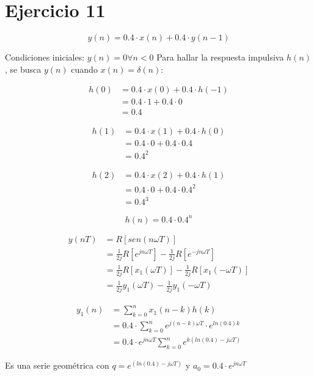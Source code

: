 \documentclass[../../guia1.tex]{subfiles}
\begin{document}
\section*{Ejercicio 11}
\[y(n) = 0.4\cdot x(n) + 0.4\cdot y(n-1)\]

Condiciones iniciales: $y(n)=0 \forall n<0$
Para hallar la respuesta impulsiva $h(n)$, se busca $y(n)$ cuando $x(n) = \delta(n)$:

\begin{align*}
	h(0) &= 0.4\cdot x(0) + 0.4 \cdot h(-1)\\
		 &= 0.4\cdot 1 + 0.4 \cdot 0\\
		 &= 0.4
\end{align*}


\begin{align*}
	h(1) &= 0.4\cdot x(1) + 0.4 \cdot h(0)\\
		 &= 0.4\cdot 0 + 0.4 \cdot 0.4\\
		 &=0.4^2
\end{align*}


\begin{align*}
	h(2) &= 0.4\cdot x(2) + 0.4 \cdot h(1)\\
		 &= 0.4\cdot 0 + 0.4 \cdot 0.4^2\\
		 &= 0.4^3
\end{align*}


\[h(n) = 0.4\cdot 0.4^n\]

\begin{align*}
y(nT) &= R \left[sen(n\omega T)\right]\\
	 &= \frac{1}{2j} R\left[ e^{jn\omega T}\right]
	  - \frac{1}{2j} R\left[e^{-jn\omega T}\right]\\
	 &= \frac{1}{2j} R\left[ x_1(\omega T)\right]
	  - \frac{1}{2j} R\left[ x_1(-\omega T)\right]\\
	 &= \frac{1}{2j} y_1(\omega T)
	  - \frac{1}{2j} y_1(-\omega T)
\end{align*}

\vspace{.5in}

\begin{align*}
y_1(n) &=\sum_{k=0}^{n} x_1(n-k)h(k)\\
	   &=0.4\cdot \sum_{k=0}^{n}e^{j(n-k)\omega T}\cdot e^{ln(0.4)k}\\
	   &=0.4\cdot e^{jn\omega T}\sum_{k=0}^{n}e^{k(ln(0.4)-j\omega T)}
\end{align*}

Es una serie geom\'etrica con $q = e^{(ln(0.4)-j\omega T)}$ y $a_0 = 0.4\cdot e^{jn\omega T}$
\end{document}

